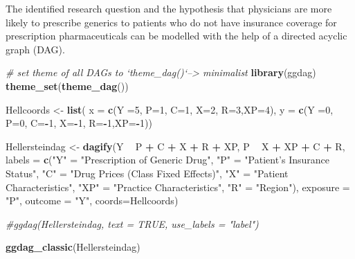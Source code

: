 \documentclass[
]{book}
\newenvironment{Shaded}{\begin{snugshade}}{\end{snugshade}}
\newcommand{\CommentTok}[1]{\textcolor[rgb]{0.56,0.35,0.01}{\textit{#1}}}
\newcommand{\DataTypeTok}[1]{\textcolor[rgb]{0.13,0.29,0.53}{#1}}
\newcommand{\DecValTok}[1]{\textcolor[rgb]{0.00,0.00,0.81}{#1}}
\newcommand{\KeywordTok}[1]{\textcolor[rgb]{0.13,0.29,0.53}{\textbf{#1}}}
\newcommand{\NormalTok}[1]{#1}
\newcommand{\OperatorTok}[1]{\textcolor[rgb]{0.81,0.36,0.00}{\textbf{#1}}}
\newcommand{\StringTok}[1]{\textcolor[rgb]{0.31,0.60,0.02}{#1}}
\begin{document}
The identified research question and the hypothesis that physicians are
more likely to prescribe generics to patients who do not have insurance
coverage for prescription pharmaceuticals can be modelled with the help
of a directed acyclic graph (DAG).

\begin{Shaded}
\begin{Highlighting}[]
\CommentTok{#  set theme of all DAGs to `theme_dag()`--> minimalist }
\KeywordTok{library}\NormalTok{(ggdag)}
\KeywordTok{theme_set}\NormalTok{(}\KeywordTok{theme_dag}\NormalTok{())}

\NormalTok{Hellcoords <-}\StringTok{ }\KeywordTok{list}\NormalTok{(}
    \DataTypeTok{x =} \KeywordTok{c}\NormalTok{(}\DataTypeTok{Y =}\DecValTok{5}\NormalTok{, }\DataTypeTok{P=}\DecValTok{1}\NormalTok{, }\DataTypeTok{C=}\DecValTok{1}\NormalTok{, }\DataTypeTok{X=}\DecValTok{2}\NormalTok{, }\DataTypeTok{R=}\DecValTok{3}\NormalTok{,}\DataTypeTok{XP=}\DecValTok{4}\NormalTok{),}
    \DataTypeTok{y =} \KeywordTok{c}\NormalTok{(}\DataTypeTok{Y =}\DecValTok{0}\NormalTok{, }\DataTypeTok{P=}\DecValTok{0}\NormalTok{, }\DataTypeTok{C=}\OperatorTok{-}\DecValTok{1}\NormalTok{, }\DataTypeTok{X=}\OperatorTok{-}\DecValTok{1}\NormalTok{, }\DataTypeTok{R=}\OperatorTok{-}\DecValTok{1}\NormalTok{,}\DataTypeTok{XP=}\OperatorTok{-}\DecValTok{1}\NormalTok{))}


\NormalTok{Hellersteindag <-}\StringTok{ }\KeywordTok{dagify}\NormalTok{(Y }\OperatorTok{~}\StringTok{ }\NormalTok{P }\OperatorTok{+}\StringTok{ }\NormalTok{C }\OperatorTok{+}\StringTok{ }\NormalTok{X }\OperatorTok{+}\StringTok{ }\NormalTok{R }\OperatorTok{+}\StringTok{ }\NormalTok{XP,}
\NormalTok{                         P }\OperatorTok{~}\StringTok{ }\NormalTok{X }\OperatorTok{+}\StringTok{ }\NormalTok{XP }\OperatorTok{+}\StringTok{ }\NormalTok{C }\OperatorTok{+}\StringTok{ }\NormalTok{R,}
                         \DataTypeTok{labels =} \KeywordTok{c}\NormalTok{(}\StringTok{"Y"}\NormalTok{ =}\StringTok{ "Prescription of Generic Drug"}\NormalTok{,}
                                    \StringTok{"P"}\NormalTok{ =}\StringTok{ "Patient's Insurance Status"}\NormalTok{,}
                                    \StringTok{"C"}\NormalTok{ =}\StringTok{ "Drug Prices (Class Fixed Effects)"}\NormalTok{,}
                                    \StringTok{"X"}\NormalTok{ =}\StringTok{ "Patient Characteristics"}\NormalTok{,}
                                    \StringTok{"XP"}\NormalTok{ =}\StringTok{ "Practice Characteristics"}\NormalTok{,}
                                    \StringTok{"R"}\NormalTok{ =}\StringTok{ "Region"}\NormalTok{),}
                         \DataTypeTok{exposure =} \StringTok{"P"}\NormalTok{,}
                         \DataTypeTok{outcome =} \StringTok{"Y"}\NormalTok{, }\DataTypeTok{coords=}\NormalTok{Hellcoords)}

\CommentTok{#ggdag(Hellersteindag, text = TRUE, use_labels = "label")}

\KeywordTok{ggdag_classic}\NormalTok{(Hellersteindag)}
\end{Highlighting}
\end{Shaded}
\end{document}
